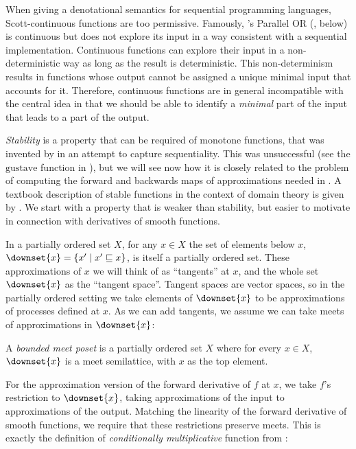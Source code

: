 When giving a denotational semantics for sequential programming
languages, Scott-continuous functions are too permissive. Famously,
\citet{plotkin77lcf}'s Parallel OR (, below) is
continuous but does not explore its input in a way consistent with a
sequential implementation. Continuous functions can explore their
input in a non-deterministic way as long as the result is
deterministic. This non-determinism results in functions whose
output cannot be assigned a unique minimal input that accounts for
it. Therefore, continuous functions are in general incompatible with the central
idea in \GPS that we should be able to identify a \emph{minimal} part
of the input that leads to a part of the output.

\emph{Stability} is a property that can be required of monotone functions, that was invented by \citet{berry79} in an attempt to capture sequentiality. This was unsuccessful (see the $\mathrm{gustave}$ function in ), but we will see now how it is closely related to the problem of computing the forward and backwards maps of approximations needed in \GPS. A textbook description of stable functions in the context of domain theory is given by \citet[Chapter 12]{amadio-curien}. We start with a property that is weaker than stability, but easier to motivate in connection with derivatives of smooth functions.

In a partially ordered set $X$, for any $x \in X$ the set of elements below $x$, $\downset{x} = \{ x' \mid x' \sqsubseteq x \}$, is itself a partially ordered set. These approximations of $x$ we will think of as ``tangents'' at $x$, and the whole set $\downset{x}$ as the ``tangent space''. Tangent spaces are vector spaces, so in the partially ordered setting we take elements of $\downset{x}$ to be approximations of processes defined at $x$. As we can add tangents, we assume we can take meets of approximations in $\downset{x}$:


\begin{definition}
  A \emph{bounded meet poset} is a partially ordered set $X$ where for
  every $x \in X$, $\downset{x}$ is a meet semilattice, with $x$ as
  the top element.
\end{definition}

For the approximation version of the forward derivative of $f$ at $x$, we take $f$'s restriction to $\downset{x}$, taking approximations of the input to approximations of the output. Matching the linearity of the forward derivative of smooth functions, we require that these restrictions preserve meets. This is exactly the definition of \emph{conditionally multiplicative} function from \citet{berry79}:

